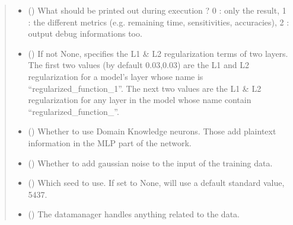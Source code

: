 \documentclass[letterpaper,10pt,english]{sphinxmanual}
\begin{document}
\begin{fulllineitems}
\begin{fulllineitems}
\begin{quote}
\begin{description}
\begin{itemize}
\item {} 
\sphinxAtStartPar
{} (\sphinxstyleliteralemphasis{\sphinxupquote{, }}) \textendash{} What should be printed out during execution ? 0 : only the result,
1 : the different metrics (e.g. remaining time, sensitivities, accuracies),
2 : output debug informations too.

\item {} 
\sphinxAtStartPar
{} (\sphinxstyleliteralemphasis{\sphinxupquote{{[}}}\sphinxstyleliteralemphasis{\sphinxupquote{{]}}}\sphinxstyleliteralemphasis{\sphinxupquote{, }}) \textendash{} If not None, specifies the L1 \& L2 regularization terms of two layers.
The first two values (by default 0.03,0.03) are the L1 and L2 regularization
for a model’s layer whose name is “regularized\_function\_1”. The next two values
are the L1 \& L2 regularization for any layer in the model whose name contain
“regularized\_function\_”.

\item {} 
\sphinxAtStartPar
{} (\sphinxstyleliteralemphasis{\sphinxupquote{, }}) \textendash{} Whether to use Domain Knowledge neurons. Those add plaintext information
in the MLP part of the network.

\item {} 
\sphinxAtStartPar
{} (\sphinxstyleliteralemphasis{\sphinxupquote{, }}) \textendash{} Whether to add gaussian noise to the input of the training data.

\item {} 
\sphinxAtStartPar
{} (\sphinxstyleliteralemphasis{\sphinxupquote{, }}) \textendash{} Which seed to use. If set to None, will use a default standard value, 5437.

\item {} 
\sphinxAtStartPar
{} (\sphinxstyleliteralemphasis{\sphinxupquote{, }}\sphinxstyleliteralemphasis{\sphinxupquote{(}}\sphinxstyleliteralemphasis{\sphinxupquote{)}}) \textendash{} The datamanager handles anything related to the data.


\end{itemize}
\end{description}
\end{quote}
\end{fulllineitems}
\end{fulllineitems}
\end{document}
